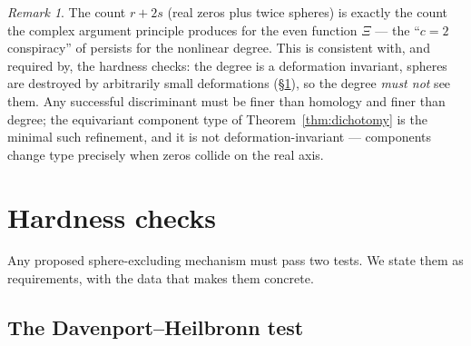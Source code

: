 \documentclass[11pt]{amsart}
\theoremstyle{plain}
\theoremstyle{definition}
\theoremstyle{remark}
\newtheorem{remark}[theorem]{Remark}
\begin{document}
\begin{remark}\label{rem:c2}
The count $r+2s$ (real zeros plus twice spheres) is exactly the count the complex argument
principle produces for the even function $\Xi$ --- the ``$c=2$ conspiracy'' of
\cite[\S7]{Baker2015} persists for the nonlinear degree. This is consistent with, and required
by, the hardness checks: the degree is a deformation invariant, spheres are destroyed by
arbitrarily small deformations (\S\ref{sec:hardness}), so the degree \emph{must not} see them.
Any successful discriminant must be finer than homology and finer than degree; the equivariant
component type of Theorem~\ref{thm:dichotomy} is the minimal such refinement, and it is not
deformation-invariant --- components change type precisely when zeros collide on the real axis.
\end{remark}

\section{Hardness checks}\label{sec:hardness}

Any proposed sphere-excluding mechanism must pass two tests. We state them as requirements,
with the data that makes them concrete.

\subsection{The Davenport--Heilbronn test}\label{subsec:DH}
\end{document}
